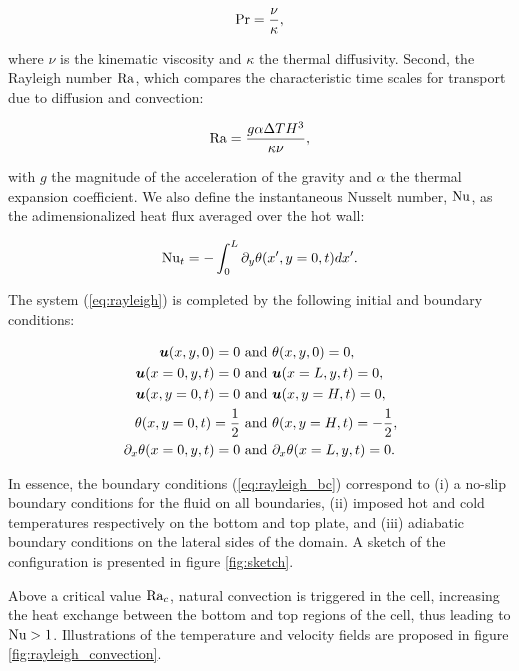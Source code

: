 \begin{equation*}
	\text{Pr} = \frac{\nu}{\kappa},
\end{equation*}

where $\nu$ is the kinematic viscosity and $\kappa$ the thermal diffusivity. Second, the Rayleigh number $\text{Ra}$, which compares the characteristic time scales for transport due to diffusion and convection:

\begin{equation*}
	\text{Ra} = \frac{g \alpha \Delta T H^3}{\kappa \nu},
\end{equation*}

with $g$ the magnitude of the acceleration of the gravity and $\alpha$ the thermal expansion coefficient. We also define the instantaneous Nusselt number, $\text{Nu}$, as the adimensionalized heat flux averaged over the hot wall:

\begin{equation}
	\text{Nu}_t = - \int_{0}^{L} \partial_y \theta (x',y=0,t) dx'.
\end{equation}

The system (\ref{eq:rayleigh}) is completed by the following initial and boundary conditions:

\begin{equation}
\label{eq:rayleigh_bc}
\begin{split}
	\bm{u}(x,y,0)	= 0 &\text{ and } \theta(x,y,0)	= 0, \\
	\bm{u}(x=0,y,t)	= 0 &\text{ and } \bm{u}(x=L,y,t) = 0, \\
	\bm{u}(x,y=0,t)	= 0 &\text{ and } \bm{u}(x,y=H,t) = 0, \\
	\theta(x,y=0,t) 	= \frac{1}{2} &\text{ and } \theta(x,y=H,t) =-\frac{1}{2}, \\
	\partial_x \theta(x=0,y,t) = 0 &\text{ and } \partial_x \theta(x=L,y,t) = 0.
\end{split}
\end{equation}

In essence, the boundary conditions (\ref{eq:rayleigh_bc}) correspond to (i) a no-slip boundary conditions for the fluid on all boundaries, (ii) imposed hot and cold temperatures respectively on the bottom and top plate, and (iii) adiabatic boundary conditions on the lateral sides of the domain. A sketch of the configuration is presented in figure \ref{fig:sketch}.



Above a critical value $\text{Ra}_c$, natural convection is triggered in the cell, increasing the heat exchange between the bottom and top regions of the cell, thus leading to $\text{Nu} > 1$. Illustrations of the temperature and velocity fields are proposed in figure \ref{fig:rayleigh_convection}.

